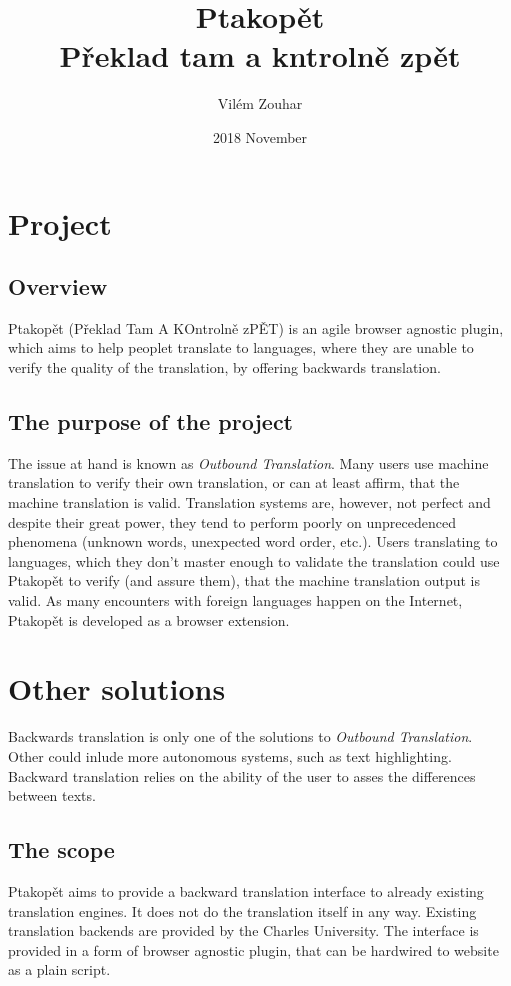 \documentclass[a4paper]{article}
\begin{document}
\title{Ptakopět \\ \large Překlad tam a kntrolně zpět}
\author{Vilém Zouhar}
\date{2018 November}
\maketitle 


\section*{Project}
\subsection*{Overview}
Ptakopět (Překlad Tam A KOntrolně zPĚT) is an agile browser agnostic plugin, which aims to help peoplet translate to languages, where they are unable to verify the quality of the translation, by offering backwards translation.

\subsection*{The purpose of the project}
The issue at hand is known as \textit{Outbound Translation}. Many users use machine translation to verify their own translation, or can at least affirm, that the machine translation is valid. Translation systems are, however, not perfect and despite their great power, they tend to perform poorly on unprecedenced phenomena (unknown words, unexpected word order, etc.). Users translating to languages, which they don't master enough to validate the translation could use Ptakopět to verify (and assure them), that the machine translation output is valid. As many encounters with foreign languages happen on the Internet, Ptakopět is developed as a browser extension.

\section*{Other solutions}
Backwards translation is only one of the solutions to \textit{Outbound Translation}. Other could inlude more autonomous systems, such as text highlighting. Backward translation relies on the ability of the user to asses the differences between texts.

\subsection*{The scope}
Ptakopět aims to provide a backward translation interface to already existing translation engines. It does not do the translation itself in any way. Existing translation backends are provided by the Charles University. The interface is provided in a form of browser agnostic plugin, that can be hardwired to website as a plain script.
\end{document}
